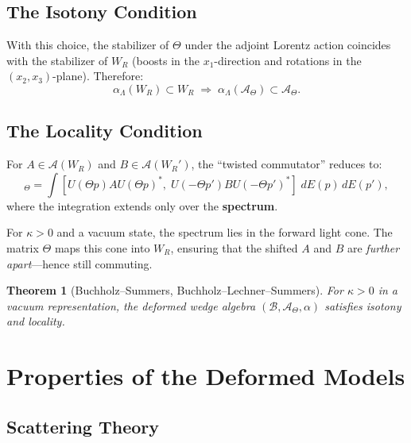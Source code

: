 \documentclass[11pt,a4paper]{article}
\newtheorem{theorem}{Theorem}[section]
\begin{document}
\subsection{The Isotony Condition}

With this choice, the stabilizer of $\Theta$ under the adjoint Lorentz
action coincides with the stabilizer of $W_R$ (boosts in the $x_1$-direction
and rotations in the $(x_2, x_3)$-plane). Therefore:
\begin{equation}
  \alpha_\Lambda(W_R) \subset W_R \;\Longrightarrow\;
  \alpha_\Lambda(\mathcal{A}_\Theta) \subset \mathcal{A}_\Theta.
\end{equation}

\subsection{The Locality Condition}

For $A \in \mathcal{A}(W_R)$ and $B \in \mathcal{A}(W_R')$, the
``twisted commutator'' reduces to:
\begin{equation}
  [A, B]_\Theta = \int [U(\Theta p) A U(\Theta p)^*,\;
  U(-\Theta p') B U(-\Theta p')^*]\; dE(p)\, dE(p'),
\end{equation}
where the integration extends only over the \textbf{spectrum}.

For $\kappa > 0$ and a vacuum state, the spectrum lies in the forward
light cone. The matrix $\Theta$ maps this cone into $W_R$, ensuring that
the shifted $A$ and $B$ are \emph{further apart}---hence still commuting.

\begin{theorem}[Buchholz--Summers, Buchholz--Lechner--Summers]
For $\kappa > 0$ in a vacuum representation, the deformed wedge algebra
$(\mathcal{B}, \mathcal{A}_\Theta, \alpha)$ satisfies isotony and locality.
\end{theorem}

\section{Properties of the Deformed Models}

\subsection{Scattering Theory}
\end{document}
